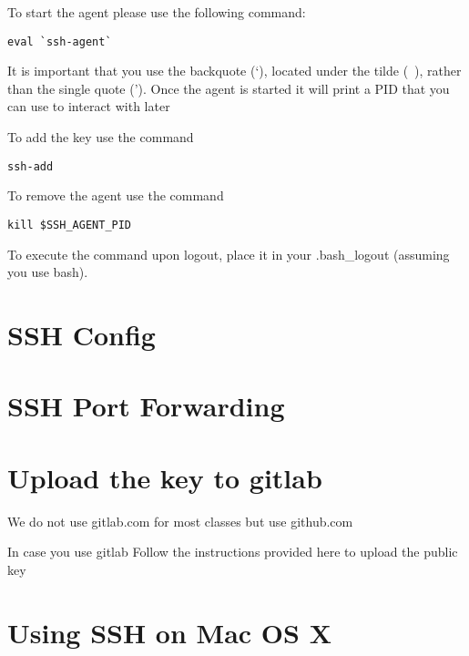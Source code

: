 To start the agent please use the following command:

\begin{verbatim}
eval `ssh-agent`
\end{verbatim}

It is important that you use the backquote (`), located under the
tilde (~), rather than the single quote ('). Once the agent is started
it will print a PID that you can use to interact with later

To add the key use the command

\begin{verbatim}
ssh-add
\end{verbatim}

To remove the agent use the command

\begin{verbatim}
kill $SSH_AGENT_PID
\end{verbatim}

To execute the command upon logout, place it in your 
.bash_logout (assuming you use bash).


\section{SSH Config}


\section{SSH Port Forwarding}


\section{Upload the key to gitlab}\label{upload-the-key-to-gitlab}

\begin{IU}
We do not use gitlab.com for most classes but use github.com
\end{IU}

In case you use gitlab  Follow the instructions provided here to
upload the public key


\section{Using SSH on Mac OS X}\label{using-ssh-on-mac-os-x}

